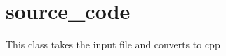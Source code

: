 \hypertarget{group__class}{\section{source\-\_\-code}
\label{group__class}
}
This class takes the input file and converts to cpp 
